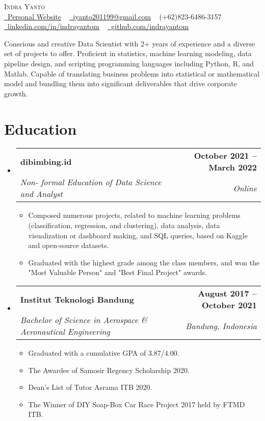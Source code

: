 \documentclass[letterpaper,11pt]{article}
\makeatletter
\newcommand{\resumeItem}[1]{
	\item\small{
		{#1 \vspace{-2pt}}
	}
}
\newcommand{\resumeSubheading}[4]{
	\vspace{-2pt}\item
	\begin{tabular*}{1.0\textwidth}[t]{l@{\extracolsep{\fill}}r}
		\textbf{#1} & \textbf{\small #2} \\
		\textit{\small#3} & \textit{\small #4} \\
	\end{tabular*}\vspace{-7pt}
}
\newcommand{\resumeSubHeadingListStart}{\begin{itemize}[leftmargin=0.0in, label={}]}
\newcommand{\resumeSubHeadingListEnd}{\end{itemize}}
\newcommand{\resumeItemListStart}{\begin{itemize}}
\newcommand{\resumeItemListEnd}{\end{itemize}\vspace{-5pt}}
\makeatother
\begin{document}
	
	
	\begin{center}
		{\Huge \scshape Indra Yanto} %
	\\ \vspace{2pt}
		\small \href{https://indrayantom.github.io/indrapedia/}{\raisebox{-0.2\height}\faGlobe\ Personal Website} ~ \href{mailto:iyanto201199@gmail.com}{\raisebox{-0.2\height}\faEnvelope\  iyanto201199@gmail.com} ~ \raisebox{-0.1\height}\faPhone (+62)823-6486-3157 \\
		\href{https://www.linkedin.com/in/indrayantom/}{\raisebox{-0.2\height}\faLinkedin\ linkedin.com/in/indrayantom}  ~
		\href{https://github.com/indrayantom}{\raisebox{-0.2\height}\faGithub\ github.com/indrayantom}
		\vspace{-8pt}
	\end{center} 
	\vspace{7pt}
	
	Conscious and creative Data Scientist with 2+ years of experience and a diverse set of projects to offer. Proficient in statistics, machine learning modeling, data pipeline design, and scripting programming languages including Python, R, and Matlab. Capable of translating business problems into statistical or mathematical model and bundling them into significant deliverables that drive corporate growth.	
	\section{Education}
	\resumeSubHeadingListStart
	\resumeSubheading
	{dibimbing.id}{October 2021 -- March 2022}
	{Non- formal Education of Data Science and Analyst}{Online}
		\resumeItemListStart
	\resumeItem{Composed numerous projects, related to machine learning problems (classification, regression, and clustering), data analysis, data visualization or dashboard making, and SQL queries, based on Kaggle and open-source datasets.}
	\resumeItem{Graduated with the highest grade among the class members, and won the "Most Valuable Person" and "Best Final Project" awards.}
	\resumeItemListEnd
	\resumeSubheading
	{Institut Teknologi Bandung}{August 2017 -- October 2021}
	{Bachelor of Science in Aerospace \& Aeronautical Engineering}{Bandung, Indonesia}
	\resumeItemListStart
	\resumeItem{Graduated with a cumulative GPA  of 3.87/4.00. }
	\resumeItem{The Awardee of Samosir Regency Scholarship 2020.}
	\resumeItem{Dean's List of Tutor Asrama ITB 2020.}
	\resumeItem{The Winner of DIY Soap-Box Car Race Project 2017 held by FTMD ITB.}
	\resumeItemListEnd
	\resumeSubHeadingListEnd
	
\end{document}
